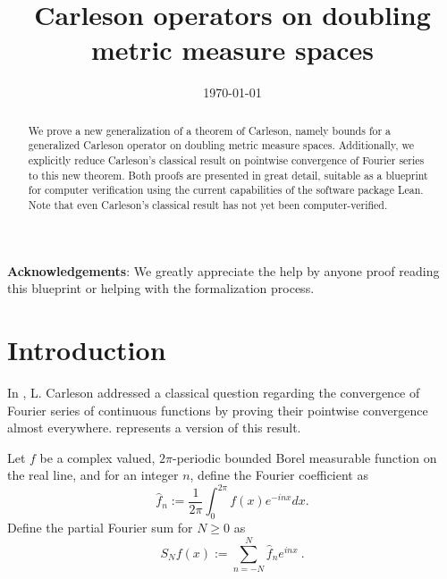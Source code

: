 
%
\title{Carleson operators on doubling metric measure spaces}

\date{\today}

\begin{abstract}
    We prove a new generalization of a theorem of Carleson, namely bounds for a generalized Carleson operator on doubling metric measure spaces.
    Additionally, we explicitly reduce Carleson's classical result on pointwise convergence of Fourier series to this new theorem.
    Both proofs are presented in great detail, suitable as a blueprint for computer verification using the current capabilities of the software package Lean.
    Note that even Carleson's classical result has not yet been computer-verified.
\end{abstract}

\maketitle

\tableofcontents

\textbf{Acknowledgements}: We greatly appreciate the help by anyone proof reading this blueprint or helping with the formalization process.

\chapter{Introduction}

In \cite{carleson}, L. Carleson addressed a classical question regarding the convergence of Fourier series of continuous functions by proving their pointwise convergence almost everywhere.  represents a version of this result.

Let $f$ be a complex valued, $2\pi$-periodic bounded Borel measurable function on the real line, and for an integer $n$, define the Fourier coefficient as
\begin{equation}
    \widehat{f}_n:=\frac {1}{2\pi} \int_0^{2\pi} f(x) e^{- i nx} dx .
\end{equation}
Define the partial Fourier sum for $N\ge 0$ as
\begin{equation}
    S_Nf(x):=\sum_{n=-N}^N \widehat{f}_n e^{i nx}\ .
\end{equation}

